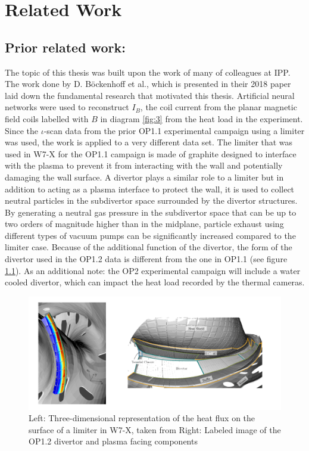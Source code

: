 %
\chapter{Related Work}
\label{sec:related}

\section{Prior related work: }

The topic of this thesis was built upon the work of many of colleagues at IPP. The work done by D. Böckenhoff et al., which is presented in their 2018 paper \cite{Böckenhoff_2018} laid down the fundamental research that motivated this thesis. Artificial neural networks were used to reconstruct $I_B$, the coil current from the planar magnetic field coils labelled with $B$ in diagram \ref{fig:3} from the heat load in the experiment. Since the $\iota$-scan data from the prior OP1.1 experimental campaign using a limiter was used, the work is applied to a very different data set. The limiter that was used in W7-X for the OP1.1 campaign is made of graphite designed to interface with the plasma to prevent it from interacting with the wall and potentially damaging the wall surface. A divertor plays a similar role to a limiter but in addition to acting as a plasma interface to protect the wall, it is used to collect neutral particles in the subdivertor space surrounded by the divertor structures. By generating a neutral gas pressure in the subdivertor space that can be up to two orders of magnitude higher than in the midplane, particle exhaust using different types of vacuum pumps can be significantly increased compared to the limiter case. Because of the additional function of the divertor, the form of the divertor used in the OP1.2 data is different  from the one in OP1.1 (see figure \ref{fig:limiter-divertor}). As an additional note: the OP2 experimental campaign will include a water cooled divertor, which can impact the heat load recorded by the thermal cameras.

\begin{figure}[!htb]
    \centering
    \includegraphics[width = \textwidth]{images/limiter-divetor.png}
    \caption{Left: Three-dimensional representation of the heat flux on the surface of a limiter in W7-X, taken from \cite{Böckenhoff_2018} Right: Labeled image of the OP1.2 divertor and plasma facing components} \label{fig:limiter-divertor}
\end{figure}

